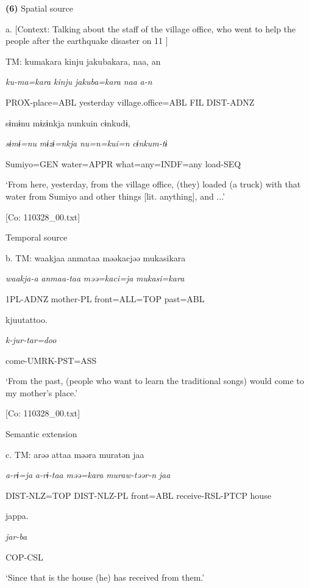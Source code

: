 \textbf{(6)}  Spatial source

  a.  [Context: Talking about the staff of the village office, who went to help the people after the earthquake disaster on 11 \citealt{March2011}]

    TM:  kumakara  kinju  jakubakara,  naa,  an

      \textit{ku-ma=kara}  \textit{kinju}  \textit{jakuba=kara}  \textit{naa}  \textit{a-n}

      PROX-place=ABL  yesterday  village.office=ABL  FIL  DIST-ADNZ

      sɨmɨnu  mɨzɨnkja  nunkuin  cɨnkudɨ,

      \textit{sɨmɨ=nu}  \textit{mɨzɨ=nkja}  \textit{nu=n=kui=n}  \textit{cɨnkum-tɨ}

      Sumiyo=GEN  water=APPR  what=any=INDF=any  load-SEQ

      ‘From here, yesterday, from the village office, (they) loaded (a truck) with that water from Sumiyo and other things [lit. anything], and ...’

      [Co: 110328\_00.txt]

  Temporal source

  b.  TM:  waakjaa  anmataa  məəkacjəə  mukasikara

      \textit{waakja-a}  \textit{anmaa-taa}  \textit{məə=kaci=ja}  \textit{mukasi=kara}

      1PL-ADNZ  mother-PL  front=ALL=TOP  past=ABL

      kjuutattoo.

      \textit{k-jur-tar=doo}

      come-UMRK-PST=ASS

      ‘From the past, (people who want to learn the traditional songs) would come to my mother’s place.’

      [Co: 110328\_00.txt]

  Semantic extension

  c.  TM:  arəə  attaa  məəra  muratən  jaa

      \textit{a-rɨ=ja}  \textit{a-rɨ-taa}  \textit{məə=kara}  \textit{muraw-təər-n}  \textit{jaa}

      DIST-NLZ=TOP  DIST-NLZ-PL  front=ABL  receive-RSL-PTCP  house

      jappa.

      \textit{jar-ba}

      COP-CSL

      ‘Since that is the house (he) has received from them.’

